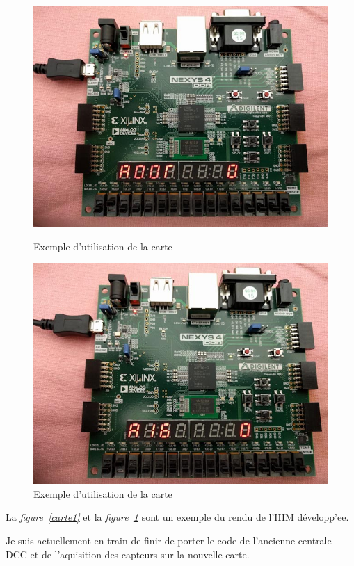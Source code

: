 \begin{figure}[h]
    \begin{minipage}[c]{.46\linewidth}
        \centering
        \includegraphics[scale=0.3]{exe_add.jpg}
        \caption{Exemple d'utilisation de la carte}
        \label{carte1}
    \end{minipage}
    \hfill%
    \begin{minipage}[c]{.46\linewidth}
        \centering
        \includegraphics[scale=0.3]{exe_aigui.jpg}
        \caption{Exemple d'utilisation de la carte}
        \label{carte2}
    \end{minipage}
\end{figure}

La \emph{figure~\ref{carte1}} et la \emph{figure~\ref{carte2}} sont un
exemple du rendu de l'IHM d\'evelopp'ee.

Je suis actuellement en train de finir de porter le code de l'ancienne
centrale DCC et de l'aquisition des capteurs sur la nouvelle carte.

\newpage






